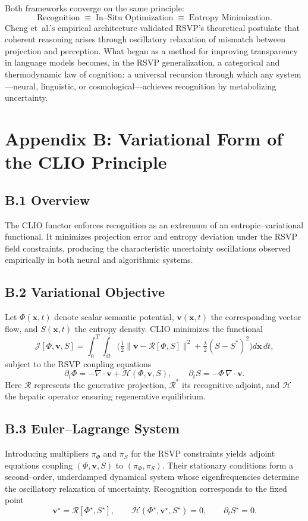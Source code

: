 \documentclass[11pt]{article}
\begin{document}
Both frameworks converge on the same principle:
\[
\text{Recognition} \;\equiv\; \text{In--Situ Optimization}
\;\equiv\; \text{Entropy Minimization}.
\]
Cheng et~al.’s empirical architecture validated RSVP’s theoretical postulate that
coherent reasoning arises through oscillatory relaxation of mismatch between
projection and perception.  
What began as a method for improving transparency in language models becomes,
in the RSVP generalization, a categorical and thermodynamic law of cognition:
a universal recursion through which any system---neural, linguistic, or
cosmological---achieves recognition by metabolizing uncertainty.

\section*{Appendix B: Variational Form of the CLIO Principle}

\subsection*{B.1 Overview}
The CLIO functor enforces recognition as an extremum of an entropic–variational
functional.  It minimizes projection error and entropy deviation under the RSVP
field constraints, producing the characteristic uncertainty oscillations observed
empirically in both neural and algorithmic systems.

\subsection*{B.2 Variational Objective}
Let $\Phi(\mathbf{x},t)$ denote scalar semantic potential, 
$\mathbf{v}(\mathbf{x},t)$ the corresponding vector flow, and 
$S(\mathbf{x},t)$ the entropy density.  
CLIO minimizes the functional
\[
\mathcal{J}[\Phi,\mathbf{v},S]
 = \!\int_{0}^{T}\!\!\!\int_{\Omega}
   \Big(
      \tfrac{1}{2}\|\mathbf{v}-\mathcal{R}[\Phi,S]\|^{2}
      + \tfrac{\lambda}{2}(S-S^{\ast})^{2}
   \Big)
   d\mathbf{x}\,dt,
\]
subject to the RSVP coupling equations
\[
\partial_t\Phi = -\nabla\!\cdot\!\mathbf{v}+\mathcal{H}(\Phi,\mathbf{v},S),
\qquad
\partial_t S = -\Phi\,\nabla\!\cdot\!\mathbf{v}.
\]
Here $\mathcal{R}$ represents the generative projection, $\mathcal{R}^\ast$ its
recognitive adjoint, and $\mathcal{H}$ the hepatic operator ensuring regenerative
equilibrium.

\subsection*{B.3 Euler–Lagrange System}
Introducing multipliers $\pi_{\Phi}$ and $\pi_{S}$ for the RSVP constraints yields
adjoint equations coupling $(\Phi,\mathbf{v},S)$ to 
$(\pi_{\Phi},\pi_{S})$.  Their stationary conditions form a
second–order, underdamped dynamical system whose eigenfrequencies determine the
oscillatory relaxation of uncertainty.  
Recognition corresponds to the fixed point
\[
\mathbf{v}^{\star}=\mathcal{R}[\Phi^{\star},S^{\star}],
\qquad
\mathcal{H}(\Phi^{\star},\mathbf{v}^{\star},S^{\star})=0,
\qquad
\partial_t S^{\star}=0.
\]
\end{document}

